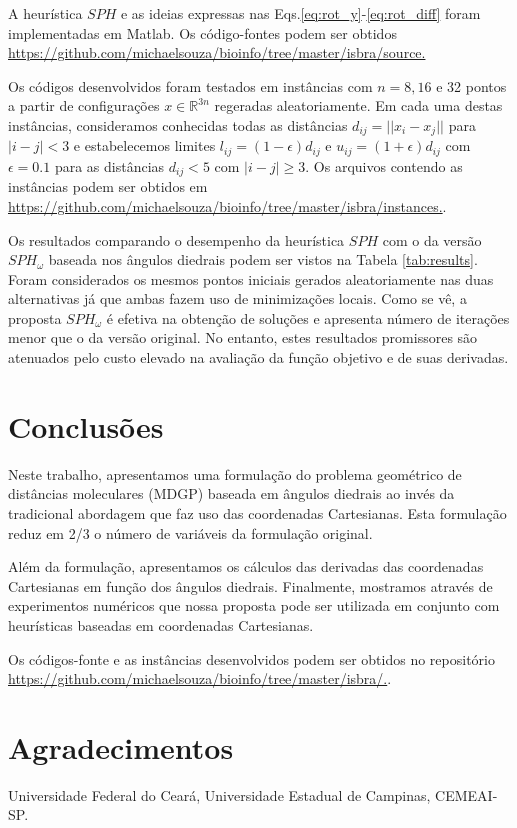 \documentclass[10pt,a4paper]{article}
\newcommand{\R}{\mathbb{R}}
\begin{document}
A heurística $SPH$ e as ideias expressas nas Eqs.\eqref{eq:rot_y}-\eqref{eq:rot_diff} foram implementadas em Matlab. Os código-fontes podem ser obtidos  \url{https://github.com/michaelsouza/bioinfo/tree/master/isbra/source.}

Os códigos desenvolvidos foram testados em instâncias com $n=8, 16$ e 32 pontos a partir de configurações $x\in\R^{3n}$ regeradas aleatoriamente. Em cada uma destas instâncias, consideramos conhecidas todas as distâncias $d_{ij}=||x_i-x_j||$ para $|i-j|<3$ e estabelecemos limites $l_{ij}=(1-\epsilon)d_{ij}$ e $u_{ij}=(1+\epsilon)d_{ij}$ com $\epsilon=0.1$ para as distâncias $d_{ij}<5$ com $|i-j|\geq 3$. Os arquivos contendo as instâncias podem ser obtidos em \url{https://github.com/michaelsouza/bioinfo/tree/master/isbra/instances.}.

Os resultados comparando o desempenho da heurística $SPH$ com o da versão $SPH_\omega$ baseada nos ângulos diedrais podem ser vistos na Tabela \eqref{tab:results}. Foram considerados os mesmos pontos iniciais gerados aleatoriamente nas duas alternativas já que ambas fazem uso de minimizações locais. Como se vê, a proposta  $SPH_\omega$ é efetiva na obtenção de soluções e apresenta número de iterações menor que o da versão original. No entanto, estes resultados promissores são atenuados pelo custo elevado na avaliação da função objetivo e de suas derivadas.

\section{Conclusões}\label{sec:conclusions}
Neste trabalho, apresentamos uma formulação do problema geométrico de distâncias moleculares (MDGP) baseada em ângulos diedrais ao invés da tradicional abordagem que faz uso das coordenadas Cartesianas. Esta formulação reduz em 2/3 o número de variáveis da formulação original.

Além da formulação, apresentamos os cálculos das derivadas das coordenadas Cartesianas em função dos ângulos diedrais. Finalmente, mostramos através de experimentos numéricos que nossa proposta pode ser utilizada em conjunto com heurísticas baseadas em coordenadas Cartesianas. 

Os códigos-fonte e as instâncias desenvolvidos podem ser obtidos no repositório \url{https://github.com/michaelsouza/bioinfo/tree/master/isbra/.}.

\section{Agradecimentos}\label{sec:thanks}
Universidade Federal do Ceará, Universidade Estadual de Campinas, CEMEAI-SP.



\end{document}
